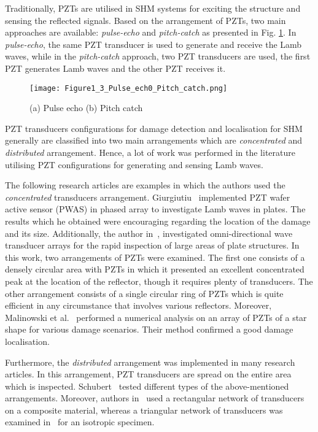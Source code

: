 Traditionally, PZTs are uti\-lised in SHM systems for exciting the structure and sensing the reflected signals. 
Based on the arrangement of PZTs, two main approaches are available: \emph{pulse-echo} and \emph{pitch-catch} as presented in Fig. \ref{fig:Pulse_echo_Pitch_catch}.
In \emph{pulse-echo}, the same PZT transducer is used to generate and receive the Lamb waves, while in the \emph{pitch-catch} approach, two PZT transducers are used, the first PZT generates Lamb waves and the other PZT receives it.


\begin{figure} [h!]
	\begin{center}
	\centering
\texttt{[image: Figure1\_3\_Pulse\_ech0\_Pitch\_catch.png]}
	\end{center}
	
\caption{(a) Pulse echo	(b) Pitch catch}
 
	\label{fig:Pulse_echo_Pitch_catch}
\end{figure}

PZT transducers configurations for damage detection and localisation for SHM generally are classified into two main arrangements which are \emph{concentrated} and \emph{distributed} arrangement. 
Hence, a lot of work was performed in the literature utilising PZT configurations for generating and sensing  Lamb waves.

The following research articles are examples in which the authors used the \emph{concentrated} transducers arrangement.
Giurgiutiu~\cite{Giurgiutiu2006} implemented PZT wafer active sensor (PWAS) in phased array to investigate Lamb waves in plates.
The results which he obtained were encouraging regarding the location of the damage and its size.
Additionally, the author in~\cite{Wilcox2003}, investigated omni-directional wave transducer arrays for the rapid inspection of large areas of plate structures. 
In this work, two arrangements of PZTs were examined. 
The first one consists of a densely circular area with PZTs in which it presented an excellent concentrated peak at the location of the reflector, though it requires plenty of transducers. 
The other arrangement consists of a single circular ring of PZTs which is quite efficient in any circumstance that involves various reflectors.
Moreover, Malinowski et al.~\cite{Malinowski2009} performed a numerical analysis on an array of PZTs of a star shape for various damage scenarios. Their method confirmed a good damage localisation.

Furthermore, the \emph{distributed} arrangement was implemented in many research articles. 
In this arrangement, PZT transducers are spread on the entire area which is inspected. Schubert~\cite{Schubert2008} tested different types of the above-mentioned arrangements. 
Moreover,  authors in~\cite{Qiang2009} used a rectangular network of transducers
on a composite material, whereas a triangular network of transducers was examined in~\cite{Wandowski2009} for an isotropic specimen.

